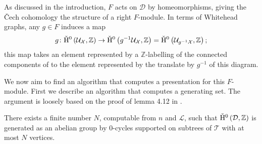 As discussed in the introduction, $F$ acts on $\mathcal{D}$ by
homeomorphisms, giving the \v{C}ech cohomology the structure of a right
$F$-module. In terms of Whitehead graphs, any $g\in F$ induces a map
\begin{equation}
g \colon \check{\mathrm{H}}{}^0\left(\mathcal{U}_\mathcal{X}, \mathbb{Z}\right) \to
\check{\mathrm{H}}{}^0\left(g^{-1}\mathcal{U}_\mathcal{X}, \mathbb{Z}\right) = 
\check{\mathrm{H}}{}^0\left(\mathcal{U}_{g^{-1}\mathcal{X}}, \mathbb{Z}\right);
\end{equation}
this map takes an element represented by a $\mathbb{Z}$-labelling of the
connected components of  to the element represented by the
translate by $g^{-1}$ of this diagram. 

We now aim to find an algorithm that computes a presentation for this
$F$-module. First we describe an algorithm that computes a generating set.
The argument is loosely based on the proof of lemma {4.12} in \cite{cashenmacura11}.

\begin{thm}\label{thm:generators0}
There exists a finite number $N$, computable from $n$ and $\mathcal{L}$,
such that $\check{\mathrm{H}}{}^0\left(\mathcal{D}, \mathbb{Z}\right)$ is generated as an
abelian group by 0-cycles supported on subtrees of $\mathcal{T}$ with at
most $N$ vertices.
\end{thm}

